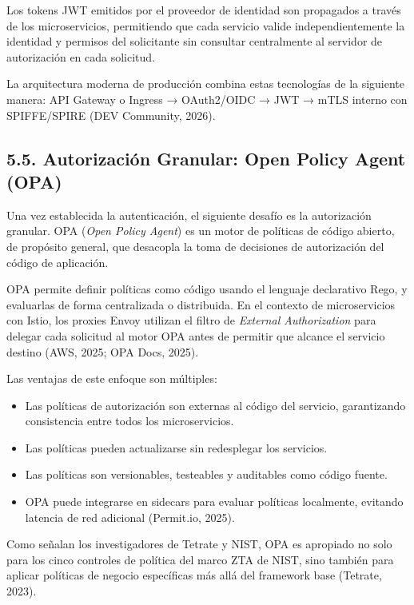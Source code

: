 \documentclass[12pt,a4paper]{article}
\begin{document}
Los tokens JWT emitidos por el proveedor de identidad son propagados a través de los microservicios, permitiendo que cada servicio valide independientemente la identidad y permisos del solicitante sin consultar centralmente al servidor de autorización en cada solicitud.

La arquitectura moderna de producción combina estas tecnologías de la siguiente manera: API Gateway o Ingress → OAuth2/OIDC → JWT → mTLS interno con SPIFFE/SPIRE (DEV Community, 2026).

\subsection{5.5. Autorización Granular: Open Policy Agent (OPA)}

Una vez establecida la autenticación, el siguiente desafío es la autorización granular. OPA (\textit{Open Policy Agent}) es un motor de políticas de código abierto, de propósito general, que desacopla la toma de decisiones de autorización del código de aplicación.

OPA permite definir políticas como código usando el lenguaje declarativo Rego, y evaluarlas de forma centralizada o distribuida. En el contexto de microservicios con Istio, los proxies Envoy utilizan el filtro de \textit{External Authorization} para delegar cada solicitud al motor OPA antes de permitir que alcance el servicio destino (AWS, 2025; OPA Docs, 2025).

Las ventajas de este enfoque son múltiples:

\begin{itemize}
  \item Las políticas de autorización son externas al código del servicio, garantizando consistencia entre todos los microservicios.
  \item Las políticas pueden actualizarse sin redesplegar los servicios.
  \item Las políticas son versionables, testeables y auditables como código fuente.
  \item OPA puede integrarse en sidecars para evaluar políticas localmente, evitando latencia de red adicional (Permit.io, 2025).
\end{itemize}

Como señalan los investigadores de Tetrate y NIST, OPA es apropiado no solo para los cinco controles de política del marco ZTA de NIST, sino también para aplicar políticas de negocio específicas más allá del framework base (Tetrate, 2023).
\end{document}
